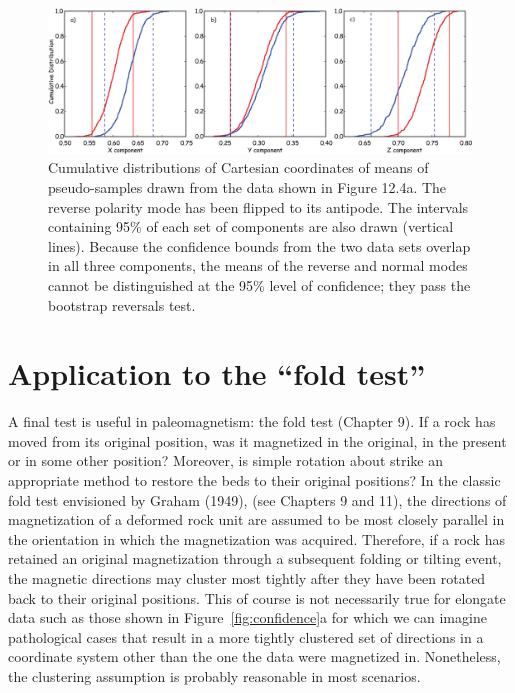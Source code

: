  \begin{figure}[h!tb]
\centering  \includegraphics[width=14 cm]{EPSfiles/revtest.eps}
\caption{Cumulative distributions of Cartesian coordinates of  means of 
pseudo-samples drawn from the data shown in
Figure 12.4a. The reverse polarity mode has been 
flipped to its antipode.  The intervals containing 95\% of each
set of components are also drawn (vertical lines).
  Because the confidence bounds from the two  data sets overlap in all
three components, the means of the reverse and normal modes  cannot
be distinguished at the 95\% level of confidence; they pass the
bootstrap reversals test.}
\label{fig:revtest}
\end{figure}



\section {Application to the ``fold test''}

A final test is useful in paleomagnetism: the 
 fold
test (Chapter 9).  
 If a rock has moved from its original
position, was  it magnetized in the original,  in the present  or in
some other position?  Moreover, is simple rotation about strike an
appropriate method to restore the beds to their original positions?
In the classic fold test envisioned  by 
Graham (1949),   \nocite{graham49}  (see Chapters 9 and  11),
the
directions of magnetization of a deformed rock unit are assumed to be
most closely
parallel in the orientation in which the magnetization was acquired.
Therefore, if
a rock has retained an original magnetization through a subsequent
folding or
tilting event, the magnetic directions may cluster most tightly after
they have been rotated back to their original positions.  This of course is not necessarily true for elongate data such as those shown in Figure~\ref{fig:confidence}a for which we can imagine pathological cases that result in a more tightly clustered set of directions in a coordinate system other than the one the data were magnetized in.  Nonetheless, the clustering assumption is probably reasonable in most scenarios.  



